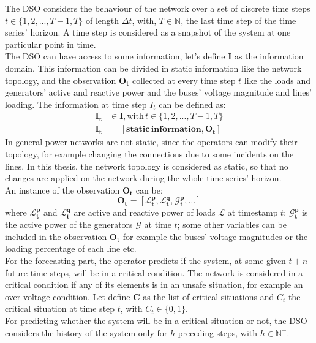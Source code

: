 The \gls{DSO} considers the behaviour of the network over a set of discrete time steps $t \in \{1,2,...,T-1,T\}$ of length $\Delta t$, with, $T \in \mathbb{N}$, the last time step of the time series’ horizon. A time step is considered as a snapshot of the system at one particular point in time. \\ 

The \gls{DSO} can have access to some information, let's define $\textbf{I}$ as the information domain. This information can be divided in static information like the network topology, and the observation $\mathbf{O_t}$ collected at every time step $t$ like the loads and generators' active and reactive power and the buses' voltage magnitude and lines' loading. The information at time step $I_t$ can be defined as:
\begin{align*}
    \mathbf{I_t} & \in \mathbf{I}, \text{with} \, t \in \{1,2,...,T-1,T\} \\
    \mathbf{I_t} & = [\mathbf{{static}} \, \mathbf{{information}}, \mathbf{O_t}]
\end{align*}
\noindent In general power networks are not static, since the operators can modify their topology, for example changing the connections due to some incidents on the lines. In this thesis, the network topology is considered as static, so that no changes are applied on the network during the whole time series' horizon.\\

\noindent An instance of the observation $\mathbf{O_t}$ can be:
\begin{equation*}
    \mathbf{O_t} =  [
            \mathbf{\mathcal{L}^p_{t}}, 
            \mathbf{\mathcal{L}^q_{t}}, 
            \mathbf{\mathcal{G}^p_{t}},
            \dots ]
\end{equation*}
\noindent where $\mathbf{\mathcal{L}^p_{t}}$ and $\mathbf{\mathcal{L}^q_{t}}$ are active and reactive power of loads $\mathcal{L}$ at timestamp $t$; $\mathbf{\mathcal{G}^p_{t}}$ is the active power of the generators $\mathcal{G}$ at time $t$; some other variables can be included in the observation $\mathbf{O_t}$ for example the buses' voltage magnitudes or the loading percentage of each line etc.\\

For the forecasting part, the operator predicts if the system, at some given $t+n$ future time steps, will be in a critical condition. The network is considered in a critical condition if any of its elements is in an unsafe situation, for example an over voltage condition. Let define $\textbf{C}$ as the list of critical situations and $C_t$ the critical situation at time step $t$, with $C_t \in \{0,1\}$.  \\
For predicting whether the system will be in a critical situation or not, the \gls{DSO} considers the history of the system only for $h$ preceding steps, with $h \in \mathbb{N}^+$. \\

